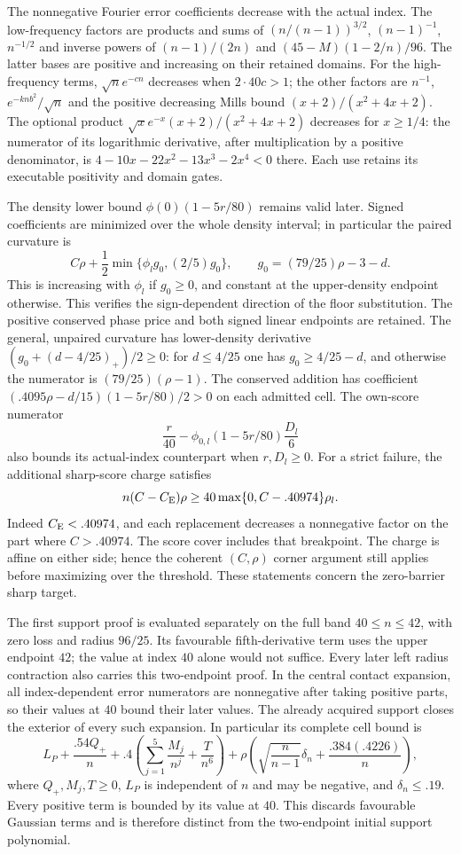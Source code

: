 The nonnegative Fourier error coefficients decrease with the actual
index. The low-frequency factors are products and sums of
$(n/(n-1))^{3/2}$, $(n-1)^{-1}$, $n^{-1/2}$ and inverse powers of
$(n-1)/(2n)$ and $(45-M)(1-2/n)/96$. The latter bases are positive
and increasing on their retained domains. For the high-frequency
terms, $\sqrt n e^{-cn}$ decreases when $2\cdot40c>1$; the other
factors are $n^{-1}$, $e^{-knb^2}/\sqrt n$ and the positive decreasing
Mills bound $(x+2)/(x^2+4x+2)$.
The optional product $\sqrt x e^{-x}(x+2)/(x^2+4x+2)$ decreases for
$x\ge1/4$: the numerator of its logarithmic derivative, after
multiplication by a positive denominator, is
$4-10x-22x^2-13x^3-2x^4<0$ there. Each use retains its executable
positivity and domain gates.

The density lower bound $\phi(0)(1-5r/80)$ remains valid later.
Signed coefficients are minimized over the whole density interval;
in particular the paired curvature is
\[
 C\rho+\frac12\min\{\phi_lg_0,(2/5)g_0\},
 \qquad g_0=(79/25)\rho-3-d.
\]
This is increasing with $\phi_l$ if $g_0\ge0$, and constant at the
upper-density endpoint otherwise. This verifies the sign-dependent
direction of the floor substitution. The positive conserved phase
price and both signed linear endpoints are retained.
The general, unpaired curvature has lower-density derivative
$(g_0+(d-4/25)_+)/2\ge0$: for $d\le4/25$ one has
$g_0\ge4/25-d$, and otherwise the numerator is
$(79/25)(\rho-1)$. The conserved addition has coefficient
$(.4095\rho-d/15)(1-5r/80)/2>0$ on each admitted cell.
The own-score numerator
\[
 \frac r{40}-\phi_{0,l}(1-5r/80)\frac{D_l}{6}
\]
also bounds its actual-index counterpart when $r,D_l\ge0$.
For a strict failure, the additional sharp-score charge satisfies
\[
 n(C-C_{\mathrm E})\rho\ge40\max\{0,C-.40974\}\rho_l.
\]
Indeed $C_{\mathrm E}<.40974$, and each replacement decreases a nonnegative
factor on the part where $C>.40974$. The score cover includes that
breakpoint. The charge is affine on either side; hence the coherent
$(C,\rho)$ corner argument still applies before maximizing over the
threshold. These statements concern the zero-barrier sharp target.

The first support proof is evaluated separately on the full band
$40\le n\le42$, with zero loss and radius $96/25$. Its favourable
fifth-derivative term uses the upper endpoint $42$; the value at index
$40$ alone would not suffice. Every later left radius contraction
also carries this two-endpoint proof. In the central contact expansion,
all index-dependent error numerators are nonnegative after taking
positive parts, so their values at $40$ bound their later values.
The already acquired support closes the exterior of every such expansion.
In particular its complete cell bound is
\[
 L_P+\frac{.54Q_+}{n}
 +.4\left(\sum_{j=1}^5\frac{M_j}{n^j}+\frac{T}{n^6}\right)
 +\rho\left(\sqrt{\frac n{n-1}}\delta_n+
                          \frac{.384(.4226)}n\right),
\]
where $Q_+,M_j,T\ge0$, $L_P$ is independent of $n$ and may be
negative, and $\delta_n\le.19$. Every positive term is bounded by
its value at $40$. This discards favourable Gaussian terms and is
therefore distinct from the two-endpoint initial support polynomial.

